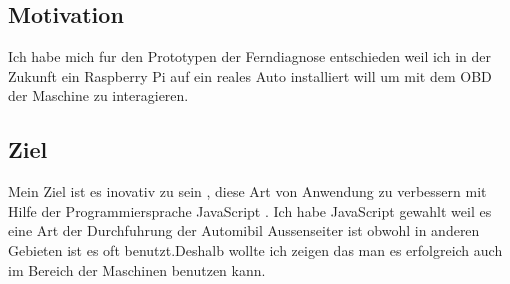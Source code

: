 \subsection{Motivation}

Ich habe mich fur den Prototypen der Ferndiagnose entschieden weil ich in der Zukunft ein Raspberry Pi auf ein reales Auto installiert will um mit dem OBD der Maschine zu interagieren.


\subsection{Ziel}

Mein Ziel ist es inovativ zu sein , diese Art von Anwendung zu verbessern mit Hilfe der Programmiersprache JavaScript . Ich habe JavaScript gewahlt weil es eine Art der Durchfuhrung der Automibil Aussenseiter ist obwohl in anderen Gebieten ist es oft benutzt.Deshalb wollte ich zeigen das man es erfolgreich auch im Bereich der Maschinen benutzen kann.